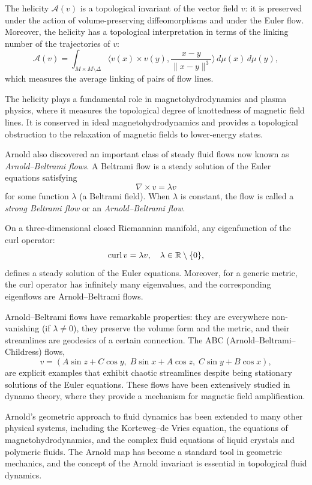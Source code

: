 \begin{theorem}
The helicity \(\mathcal{A}(v)\) is a topological invariant of the vector field \(v\): it is preserved under the action of volume-preserving diffeomorphisms and under the Euler flow. Moreover, the helicity has a topological interpretation in terms of the linking number of the trajectories of \(v\):
\[
\mathcal{A}(v) = \int_{M \times M \setminus \Delta} \langle v(x) \times v(y), \frac{x - y}{\|x - y\|^3}\rangle\,d\mu(x)\,d\mu(y),
\]
which measures the average linking of pairs of flow lines.
\end{theorem}

The helicity plays a fundamental role in magnetohydrodynamics and plasma physics, where it measures the topological degree of knottedness of magnetic field lines. It is conserved in ideal magnetohydrodynamics and provides a topological obstruction to the relaxation of magnetic fields to lower-energy states.

Arnold also discovered an important class of steady fluid flows now known as \emph{Arnold--Beltrami flows}. A Beltrami flow is a steady solution of the Euler equations satisfying
\[
\nabla \times v = \lambda v
\]
for some function \(\lambda\) (a Beltrami field). When \(\lambda\) is constant, the flow is called a \emph{strong Beltrami flow} or an \emph{Arnold--Beltrami flow}.

\begin{theorem}
On a three-dimensional closed Riemannian manifold, any eigenfunction of the curl operator:
\[
\operatorname{curl} v = \lambda v, \quad \lambda \in \mathbb{R} \setminus \{0\},
\]
defines a steady solution of the Euler equations. Moreover, for a generic metric, the curl operator has infinitely many eigenvalues, and the corresponding eigenflows are Arnold--Beltrami flows.
\end{theorem}

Arnold--Beltrami flows have remarkable properties: they are everywhere non-vanishing (if \(\lambda \neq 0\)), they preserve the volume form and the metric, and their streamlines are geodesics of a certain connection. The ABC (Arnold--Beltrami--Childress) flows,
\[
v = (A\sin z + C\cos y,\; B\sin x + A\cos z,\; C\sin y + B\cos x),
\]
are explicit examples that exhibit chaotic streamlines despite being stationary solutions of the Euler equations. These flows have been extensively studied in dynamo theory, where they provide a mechanism for magnetic field amplification.

Arnold's geometric approach to fluid dynamics has been extended to many other physical systems, including the Korteweg--de Vries equation, the equations of magnetohydrodynamics, and the complex fluid equations of liquid crystals and polymeric fluids. The Arnold map has become a standard tool in geometric mechanics, and the concept of the Arnold invariant is essential in topological fluid dynamics.


